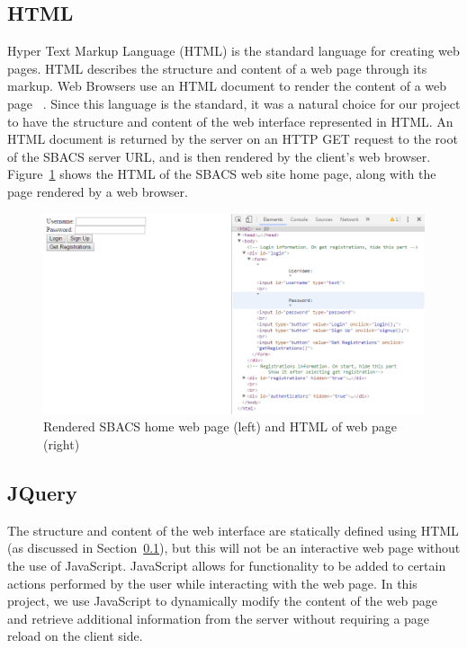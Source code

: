 \documentclass[12pt]{report}
\let\Oldsubsection\subsection
\renewcommand{\subsection}{\FloatBarrier\Oldsubsection}
\begin{document}
\subsection{HTML} \label{html}

Hyper Text Markup Language (HTML) is the standard language for creating web pages. HTML describes the
structure and content of a web page through its markup. Web Browsers use an HTML document to render
the content of a web page ~\autocite{HTMLREF}. Since this language is the standard, it was a natural choice for our
project to have the structure and content of the web interface represented in HTML. An HTML document
is returned by the server on an HTTP GET request to the root of the SBACS server URL, and is then
rendered by the client's web browser. Figure~\ref{fig:home-html} shows the HTML of the SBACS web site
home page, along with the page rendered by a web browser.

\begin{figure}
    \includegraphics[width=\textwidth]{Diagrams/Server_Diagrams/HTML}
    \caption[Comparison of rendered SBACS web page and HTML]{Rendered SBACS home web page (left) and HTML of web page (right)}
    \label{fig:home-html}
\end{figure}

\subsection{JQuery} \label{jquery}

The structure and content of the web interface are statically defined using HTML (as discussed in Section~\ref{html}), but this will not
be an interactive web page without the use of JavaScript. JavaScript allows for functionality to be
added to certain actions performed by the user while interacting with the web page. In this project,
we use JavaScript to dynamically modify the content of the web page and retrieve additional
information from the server without requiring a page reload on the client side.
\end{document}
